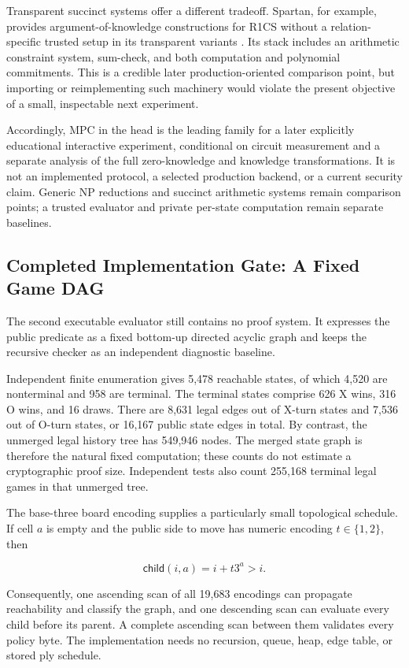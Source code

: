 Transparent succinct systems offer a different tradeoff. Spartan, for
example, provides argument-of-knowledge constructions for R1CS without a
relation-specific trusted setup in its transparent variants
\cite{setty2020spartan}. Its stack includes an arithmetic constraint system,
sum-check, and both computation and polynomial commitments. This is a credible
later production-oriented comparison point, but importing or reimplementing
such machinery would violate the present objective of a small, inspectable
next experiment.

Accordingly, MPC in the head is the leading family for a later explicitly
educational interactive experiment, conditional on circuit measurement and a
separate analysis of the full zero-knowledge and knowledge transformations.
It is not an implemented protocol, a selected production backend, or a current
security claim. Generic NP reductions and succinct arithmetic systems remain
comparison points; a trusted evaluator and private per-state computation remain
separate baselines.

\subsection{Completed Implementation Gate: A Fixed Game DAG}

The second executable evaluator still contains no proof system. It expresses
the public predicate as a fixed bottom-up directed acyclic graph and keeps the
recursive checker as an independent diagnostic baseline.

Independent finite enumeration gives 5,478 reachable states, of which 4,520
are nonterminal and 958 are terminal. The terminal states comprise 626 X wins,
316 O wins, and 16 draws. There are 8,631 legal edges out of X-turn states and
7,536 out of O-turn states, or 16,167 public state edges in total. By contrast,
the unmerged legal history tree has 549,946 nodes. The merged state graph is
therefore the natural fixed computation; these counts do not estimate a
cryptographic proof size. Independent tests also count 255,168 terminal legal
games in that unmerged tree.

The base-three board encoding supplies a particularly small topological
schedule. If cell $a$ is empty and the public side to move has numeric encoding
$t\in\{1,2\}$, then

\[
  \mathsf{child}(i,a)=i+t3^a>i.
\]

Consequently, one ascending scan of all 19,683 encodings can propagate
reachability and classify the graph, and one descending scan can evaluate
every child before its parent. A complete ascending scan between them validates
every policy byte. The implementation needs no recursion, queue, heap, edge
table, or stored ply schedule.

